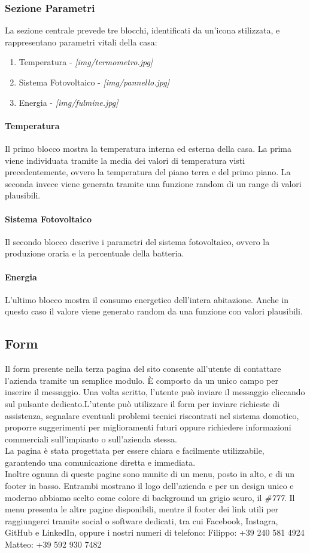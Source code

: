 \documentclass[italian, 12pt, a4paper]{article}
\begin{document}
\subsubsection{Sezione Parametri}
La sezione centrale prevede tre blocchi, identificati da un'icona stilizzata, e rappresentano parametri vitali della casa: 
\begin{enumerate}
    \item Temperatura - \emph{[img/termometro.jpg]}
    \item Sistema Fotovoltaico - \emph{[img/pannello.jpg]}
    \item Energia - \emph{[img/fulmine.jpg]}
\end{enumerate}
\paragraph{Temperatura} Il primo blocco mostra la temperatura interna ed esterna della casa. La prima viene individuata tramite la media dei valori di temperatura visti precedentemente, ovvero la temperatura del piano terra e del primo piano. La seconda invece viene generata tramite una funzione random di un range di valori plausibili. 
\paragraph{Sistema Fotovoltaico} Il secondo blocco descrive i parametri del sistema fotovoltaico, ovvero la produzione oraria e la percentuale della batteria.
\paragraph{Energia} L'ultimo blocco mostra il consumo energetico dell'intera abitazione. Anche in questo caso il valore viene generato random da una funzione con valori plausibili.  
\subsection{Form}
Il form presente nella terza pagina del sito consente all’utente di contattare l’azienda tramite un semplice modulo. È composto da un unico campo per inserire il messaggio. Una volta scritto, l’utente può inviare il messaggio cliccando sul pulsante dedicato.L’utente può utilizzare il form per inviare richieste di assistenza, segnalare eventuali problemi tecnici riscontrati nel sistema domotico, proporre suggerimenti per miglioramenti futuri oppure richiedere informazioni commerciali sull’impianto o sull’azienda stessa. \\La pagina è stata progettata per essere chiara e facilmente utilizzabile, garantendo una comunicazione diretta e immediata.\\[4mm]
Inoltre ognuna di queste pagine sono munite di un menu, posto in alto, e di un footer in basso. Entrambi mostrano il logo dell'azienda e per un design unico e moderno abbiamo scelto come colore di background un grigio scuro, il \emph{\#777}. Il menu presenta le altre pagine disponibili, mentre il footer dei link utili per raggiungerci tramite social o software dedicati, tra cui Facebook, Instagra, GitHub e LinkedIn, oppure i nostri numeri di telefono: Filippo: +39 240 581 4924 Matteo: +39 592 930 7482
\clearpage
\end{document}
